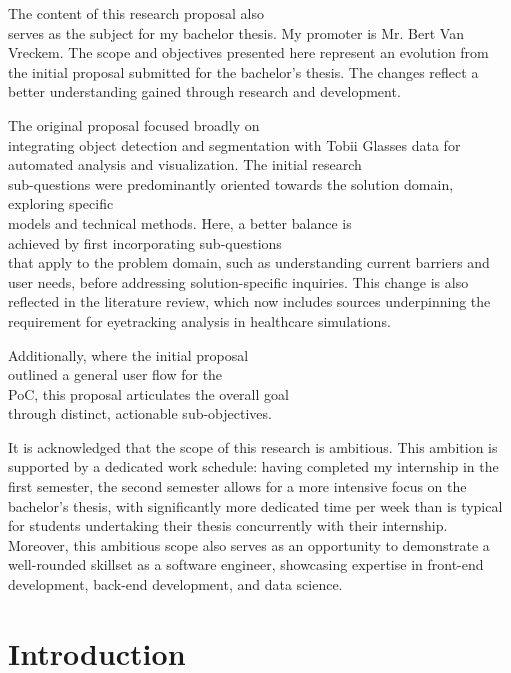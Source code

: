 \documentclass[english]{hogent-article}
\begin{document}
The content of this research proposal also\\ serves as the subject for my bachelor thesis. 
My promoter is Mr. Bert Van Vreckem. The scope and objectives presented here represent an evolution from the initial proposal submitted 
for the bachelor's thesis. The changes reflect a better understanding gained through research and development.

The original proposal focused broadly on\\ integrating object detection and segmentation with Tobii Glasses data for automated analysis and visualization.
The initial research\\ sub-questions were predominantly oriented towards the solution domain, exploring specific\\ models and technical methods.
Here, a better balance is\\ achieved by first incorporating sub-questions\\ that apply to the problem domain, 
such as understanding current barriers and user needs, before addressing solution-specific inquiries.
This change is also reflected in the literature review, which now includes sources underpinning the requirement for eyetracking analysis in healthcare simulations.

Additionally, where the initial proposal\\ outlined a general user flow for the\\ PoC,
this proposal articulates the overall goal\\ through distinct, actionable sub-objectives.

It is acknowledged that the scope of this research is ambitious.
This ambition is supported by a dedicated work schedule: having completed my internship in the first semester, the second semester allows for a more intensive focus
on the bachelor's thesis, with significantly more dedicated time per week than is typical for students undertaking their thesis concurrently with their internship.
Moreover, this ambitious scope also serves as an opportunity to demonstrate a well-rounded skillset as a software engineer, showcasing expertise in front-end development, back-end development, and data science.

\section{Introduction}
\label{sec:Introduction}
\end{document}
